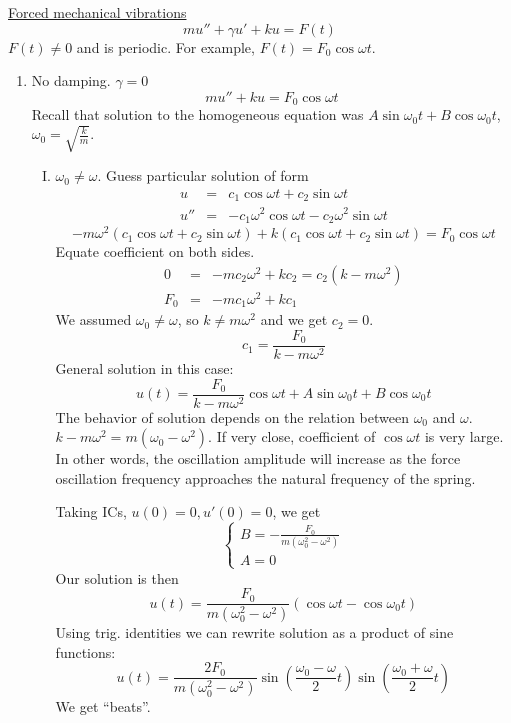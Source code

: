 \documentclass{article}
\newenvironment{enumerateromancap}{\begin{enumerate}[I.] }{\end{enumerate}}
\begin{document}
{\underline{Forced mechanical vibrations}}
\[ mu'' + \gamma u' + ku = F (t) \]
$F (t) \neq 0$ and is periodic. For example, $F (t) = F_0 \cos \omega t$.
\begin{enumerate}
  \item No damping. $\gamma = 0$
  \[ mu'' + ku = F_0 \cos \omega t \]
  Recall that solution to the homogeneous equation was $A \sin \omega_0 t + B
  \cos \omega_0 t$, $\omega_0 = \sqrt{\frac{k}{m}} .$
  \begin{enumerateromancap}
    \item $\omega_0 \neq \omega$. Guess particular solution of form
    \begin{eqnarray*}
      u & = & c_1 \cos \omega t + c_2 \sin \omega t\\
      u'' & = & - c_1 \omega^2 \cos \omega t - c_2 \omega^2 \sin \omega t
    \end{eqnarray*}
    \[ - m \omega^2  (c_1 \cos \omega t + c_2 \sin \omega t) + k (c_1 \cos
       \omega t + c_2 \sin \omega t) = F_0 \cos \omega t \]
    Equate coefficient on both sides.
    \begin{eqnarray*}
      0 & = & - mc_2 \omega^2 + kc_2 = c_2  (k - m \omega^2)\\
      F_0 & = & - mc_1 \omega^2 + kc_1
    \end{eqnarray*}
    We assumed $\omega_0 \neq \omega$, so $k \neq m \omega^2$ and we get $c_2
    = 0$.
    \[ c_1 = \frac{F_0}{k - m \omega^2} \]
    General solution in this case:
    \[ u (t) = \frac{F_0}{k - m \omega^2} \cos \omega t + A \sin \omega_0 t +
       B \cos \omega_0 t \]
    The behavior of solution depends on the relation between $\omega_0$ and
    $\omega$. $k - m \omega^2 = m (\omega_0 - \omega^2)$. If very close,
    coefficient of $\cos \omega t$ is very large. In other words, the
    oscillation amplitude will increase as the force oscillation frequency
    approaches the natural frequency of the spring.
    
    Taking ICs, $u (0) = 0, u' (0) = 0$, we get
    \[ \left\{\begin{array}{l}
         B = - \frac{F_0}{m (\omega_0^2 - \omega^2)}\\
         A = 0
       \end{array}\right. \]
    Our solution is then
    \[ u (t) = \frac{F_0}{m (\omega_0^2 - \omega^2)}  (\cos \omega t - \cos
       \omega_0 t) \]
    Using trig. identities we can rewrite solution as a product of sine
    functions:
    \[ u (t) = \frac{2 F_0}{m (\omega_0^2 - \omega^2)} \sin \left(
       \frac{\omega_0 - \omega}{2} t \right) \sin \left( \frac{\omega_0 +
       \omega}{2} t \right) \]
    We get ``beats''.
    

\end{enumerateromancap}
\end{enumerate}
\end{document}
